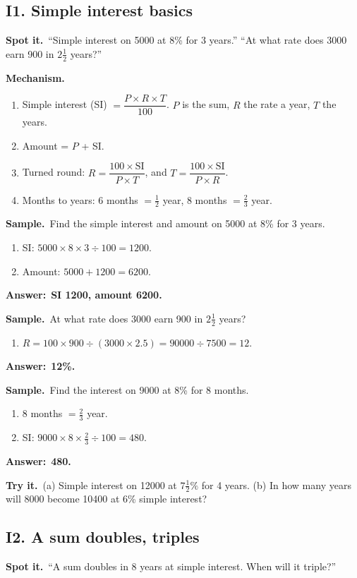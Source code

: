 \documentclass[11pt,a4paper]{article}
\let\oldsubsection\subsection
\renewcommand{\subsection}{\needspace{9\baselineskip}\oldsubsection}
\newcommand{\spot}{\textbf{\color{ember}Spot it.}\ }
\newcommand{\mech}{\textbf{\color{ember}Mechanism.}\ }
\newif\ifkeepsamp
\newcommand{\ans}[1]{\par\nopagebreak\noindent\textbf{\color{ember}Answer:}\ \textbf{#1}\par}
\newcommand{\samp}{\ifkeepsamp\needspace{4\baselineskip}\fi\textbf{\color{ember}Sample.}\ }
\newcommand{\tryit}[1]{\textbf{\color{ember}Try it.}\ #1}
\begin{document}
\subsection{I1. Simple interest basics}
\spot ``Simple interest on 5000 at 8\% for 3 years.'' ``At what rate does 3000 earn 900 in $2\tfrac12$ years?''

\mech
\begin{enumerate}
\item Simple interest (SI) $= \dfrac{P \times R \times T}{100}$. $P$ is the sum, $R$ the rate a year, $T$ the years.
\item Amount = $P$ + SI.
\item Turned round: $R = \dfrac{100 \times \text{SI}}{P \times T}$, and $T = \dfrac{100 \times \text{SI}}{P \times R}$.
\item Months to years: 6 months $= \tfrac12$ year, 8 months $= \tfrac23$ year.
\end{enumerate}

\samp Find the simple interest and amount on 5000 at 8\% for 3 years.
\begin{enumerate}
\item SI: $5000 \times 8 \times 3 \div 100 = 1200$.
\item Amount: $5000 + 1200 = 6200$.
\end{enumerate}
\ans{SI 1200, amount 6200.}

\samp At what rate does 3000 earn 900 in $2\tfrac12$ years?
\begin{enumerate}
\item $R = 100 \times 900 \div (3000 \times 2.5) = 90000 \div 7500 = 12$.
\end{enumerate}
\ans{12\%.}

\samp Find the interest on 9000 at 8\% for 8 months.
\begin{enumerate}
\item 8 months $= \tfrac23$ year.
\item SI: $9000 \times 8 \times \tfrac23 \div 100 = 480$.
\end{enumerate}
\ans{480.}

\tryit (a) Simple interest on 12000 at $7\tfrac12\%$ for 4 years. (b) In how many years will 8000 become 10400 at 6\% simple interest?

\subsection{I2. A sum doubles, triples}
\spot ``A sum doubles in 8 years at simple interest. When will it triple?''
\end{document}

